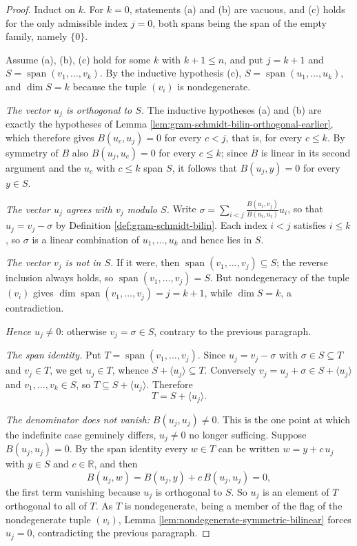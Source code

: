 \begin{proof}
\leanok
{}
Induct on $k$. For $k = 0$, statements (a) and (b) are vacuous, and (c) holds for the only admissible index $j = 0$, both spans being the span of the empty family, namely $\{0\}$.

Assume (a), (b), (c) hold for some $k$ with $k + 1 \leq n$, and put $j = k+1$ and $S = \operatorname{span}(v_1,\ldots,v_k)$. By the inductive hypothesis (c), $S = \operatorname{span}(u_1,\ldots,u_k)$, and $\dim S = k$ because the tuple $(v_i)$ is nondegenerate.

\emph{The vector $u_j$ is orthogonal to $S$.} The inductive hypotheses (a) and (b) are exactly the hypotheses of Lemma \ref{lem:gram-schmidt-bilin-orthogonal-earlier}, which therefore gives $B(u_c,u_j) = 0$ for every $c < j$, that is, for every $c \leq k$. By symmetry of $B$ also $B(u_j,u_c) = 0$ for every $c \leq k$; since $B$ is linear in its second argument and the $u_c$ with $c \leq k$ span $S$, it follows that $B(u_j, y) = 0$ for every $y \in S$.

\emph{The vector $u_j$ agrees with $v_j$ modulo $S$.} Write $\sigma = \sum_{i<j} \frac{B(u_i,v_j)}{B(u_i,u_i)} u_i$, so that $u_j = v_j - \sigma$ by Definition \ref{def:gram-schmidt-bilin}. Each index $i < j$ satisfies $i \leq k$, so $\sigma$ is a linear combination of $u_1,\ldots,u_k$ and hence lies in $S$.

\emph{The vector $v_j$ is not in $S$.} If it were, then $\operatorname{span}(v_1,\ldots,v_j) \subseteq S$; the reverse inclusion always holds, so $\operatorname{span}(v_1,\ldots,v_j) = S$. But nondegeneracy of the tuple $(v_i)$ gives $\dim \operatorname{span}(v_1,\ldots,v_j) = j = k+1$, while $\dim S = k$, a contradiction.

\emph{Hence $u_j \neq 0$}: otherwise $v_j = \sigma \in S$, contrary to the previous paragraph.

\emph{The span identity.} Put $T = \operatorname{span}(v_1,\ldots,v_j)$. Since $u_j = v_j - \sigma$ with $\sigma \in S \subseteq T$ and $v_j \in T$, we get $u_j \in T$, whence $S + \langle u_j\rangle \subseteq T$. Conversely $v_j = u_j + \sigma \in S + \langle u_j \rangle$ and $v_1,\ldots,v_k \in S$, so $T \subseteq S + \langle u_j\rangle$. Therefore
\[
T = S + \langle u_j \rangle .
\]

\emph{The denominator does not vanish:} $B(u_j,u_j) \neq 0$. This is the one point at which the indefinite case genuinely differs, $u_j \neq 0$ no longer sufficing. Suppose $B(u_j,u_j) = 0$. By the span identity every $w \in T$ can be written $w = y + c\,u_j$ with $y \in S$ and $c \in \mathbb{R}$, and then
\[
B(u_j, w) = B(u_j, y) + c\,B(u_j,u_j) = 0 ,
\]
the first term vanishing because $u_j$ is orthogonal to $S$. So $u_j$ is an element of $T$ orthogonal to all of $T$. As $T$ is nondegenerate, being a member of the flag of the nondegenerate tuple $(v_i)$, Lemma \ref{lem:nondegenerate-symmetric-bilinear} forces $u_j = 0$, contradicting the previous paragraph.


\end{proof}
